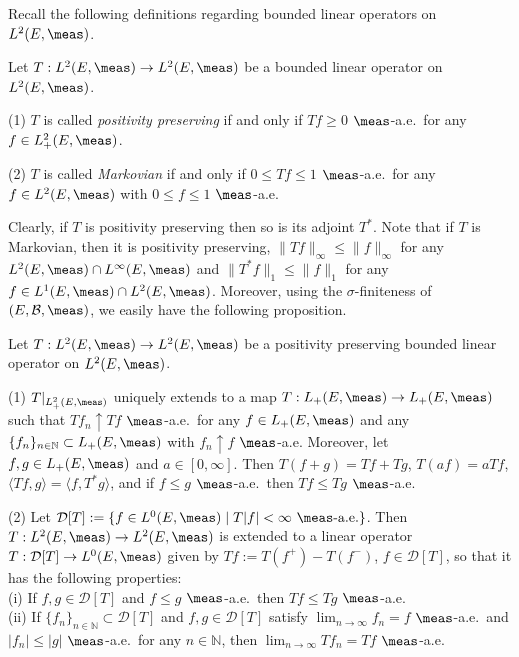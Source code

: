 Recall the following definitions regarding bounded linear operators on $L^{2}(E,\meas)$.
%
\begin{dfn}\label{dfn:pp-Markov}
Let $T:L^{2}(E,\meas)\to L^{2}(E,\meas)$ be a bounded linear operator on
$L^{2}(E,\meas)$.

\noindent
\textup{(1)} $T$ is called \emph{positivity preserving} if and only if
$Tf\geq 0$ $\meas$-a.e.\ for any $f\in L^{2}_{+}(E,\meas)$.

\noindent
\textup{(2)} $T$ is called \emph{Markovian} if and only if
$0\leq Tf\leq 1$ $\meas$-a.e.\ for any $f\in L^{2}(E,\meas)$ with
$0\leq f\leq 1$ $\meas$-a.e.
\end{dfn}
%
Clearly, if $T$ is positivity preserving then so is its adjoint $T^{*}$. Note that
if $T$ is Markovian, then it is positivity preserving, $\|Tf\|_{\infty}\leq\|f\|_{\infty}$
for any $L^{2}(E,\meas)\cap L^{\infty}(E,\meas)$ and
$\|T^{*}f\|_{1}\leq\|f\|_{1}$ for any $f\in L^{1}(E,\meas)\cap L^{2}(E,\meas)$.
Moreover, using the $\sigma$-finiteness of $(E,\mathcal{B},\meas)$,
we easily have the following proposition.
%
\begin{prop}\label{prop:T-extension-pos}
Let $T:L^{2}(E,\meas)\to L^{2}(E,\meas)$ be a positivity preserving bounded
linear operator on $L^{2}(E,\meas)$.

\noindent
\textup{(1)} $T|_{L^{2}_{+}(E,\meas)}$ uniquely extends to a map
$T:L_{+}(E,\meas)\to L_{+}(E,\meas)$ such that
$Tf_{n}\uparrow Tf$ $\meas$-a.e.\ for any $f\in L_{+}(E,\meas)$ and
any $\{f_{n}\}_{n\in\mathbb{N}}\subset L_{+}(E,\meas)$ with
$f_{n}\uparrow f$ $\meas$-a.e.
Moreover, let $f,g\in L_{+}(E,\meas)$ and $a\in[0,\infty]$. Then
$T(f+g)=Tf+Tg$, $T(af)=aTf$,
$\langle Tf,g\rangle=\langle f,T^{*}g\rangle$,
and if $f\leq g$ $\meas$-a.e.\ then $Tf\leq Tg$ $\meas$-a.e.

\noindent
\textup{(2)} Let $\mathcal{D}[T]:=\{f\in L^{0}(E,\meas)\mid T|f|<\infty\ \meas\textrm{-a.e.}\}$.
Then $T:L^{2}(E,\meas)\to L^{2}(E,\meas)$ is extended to a linear operator
$T:\mathcal{D}[T]\to L^{0}(E,\meas)$ given by
$Tf:=T(f^{+})-T(f^{-})$, $f\in\mathcal{D}[T]$, so that it has the following properties:\\
\textup{(i)} If $f,g\in\mathcal{D}[T]$ and $f\leq g$ $\meas$-a.e.\ then
$Tf\leq Tg$ $\meas$-a.e.\\
\textup{(ii)} If $\{f_{n}\}_{n\in\mathbb{N}}\subset\mathcal{D}[T]$ and
$f,g\in\mathcal{D}[T]$ satisfy $\lim_{n\to\infty}f_{n}=f$ $\meas$-a.e.\ and
$|f_{n}|\leq |g|$ $\meas$-a.e.\ for any $n\in\mathbb{N}$, then
$\lim_{n\to\infty}Tf_{n}=Tf$ $\meas$-a.e.
\end{prop}
